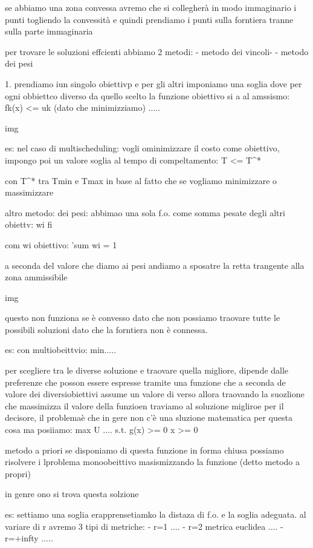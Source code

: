se abbiamo una zona convessa avremo che si collegherà in modo immaginario i punti togliendo la convessità e quindi prendiamo i punti sulla forntiera tranne sulla parte immaginaria


per trovare le soluzioni effcienti abbiamo 2 metodi:
- metodo dei vincoli-
- metodo dei pesi


1. prendiamo iun singolo obiettivp e per gli altri imponiamo una soglia dove per ogni obbiettco diverso da quello scelto la funzione obiettivo si a al amssismo:
fk(x) <= uk (dato che minimizziamo)
.....

img


es: nel caso di multischeduling:
vogli ominimizzare il costo come obiettivo, impongo poi un valore soglia al tempo di compeltamento:
T <= T^*

con T^* tra Tmin e Tmax in base al fatto che se vogliamo minimizzare o massimizzare



altro metodo: dei pesi:
abbimao una sola f.o. come somma pesate degli altri obiettv:
\sum wi fi

com wi obiettivo: 'sum wi = 1

a seconda del valore che diamo ai pesi andiamo a sposatre la retta trangente alla zona ammissibile

img

questo non funziona se è convesso dato che non possiamo traovare tutte le possibili soluzioni dato che la forntiera non è connessa. 

es: con multiobeittvio:
min.....





per scegliere tra le diverse soluzione e traovare quella migliore, dipende dalle preferenze che posson essere espresse tramite una funzione che a seconda de valore dei diversiobiettivi assume un valore di verso allora traovando la suozlione che massimizza il valore della funzioen traviamo al soluzione migliroe per il decisore, il problemaè che in gere non c'è una sluzione matematica per questa cosa ma  posiiamo:
max U ....
s.t.
g(x) >= 0
x >= 0

metodo a priori
se disponiamo di questa funzione in forma chiusa possiamo risolvere i lproblema monoobeittivo masismizzando la funzione (detto metodo a propri)

in genre ono si trova questa solzione

es: settiamo una soglia erapprensetiamko la distaza di f.o. e la soglia adeguata. al variare di r avremo  3 tipi di metriche:
- r=1 ....
- r=2 metrica euclidea ....
- r=+infty .....

